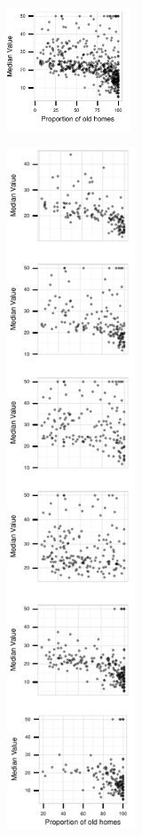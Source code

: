 \begin{figure}
 \centering 
    \begin{subfigure}[t]{1.45in}
        \includegraphics[width=1.45in]{images/AGE-MEDV.pdf}
        \caption{}
        \label{fig:method_original}
    \end{subfigure}
    \begin{subfigure}[t]{1.5in}
  	\includegraphics[width=1.5in]{images/TAX.pdf}

\end{subfigure}
\end{figure}
